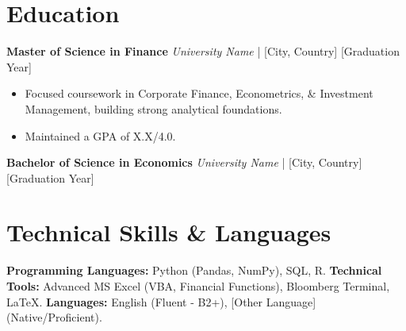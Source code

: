 \documentclass{article}
\begin{document}
\section{Education}
\textbf{Master of Science in Finance}
\textit{University Name} | [City, Country] \hfill [Graduation Year]
\begin{itemize}
    \item Focused coursework in Corporate Finance, Econometrics, \& Investment Management, building strong analytical foundations.
    \item Maintained a GPA of X.X/4.0.
\end{itemize}

\textbf{Bachelor of Science in Economics}
\textit{University Name} | [City, Country] \hfill [Graduation Year]

\section{Technical Skills \& Languages}
\textbf{Programming Languages:} Python (Pandas, NumPy), SQL, R.
\textbf{Technical Tools:} Advanced MS Excel (VBA, Financial Functions), Bloomberg Terminal, LaTeX.
\textbf{Languages:} English (Fluent - B2+), [Other Language] (Native/Proficient).
\end{document}
